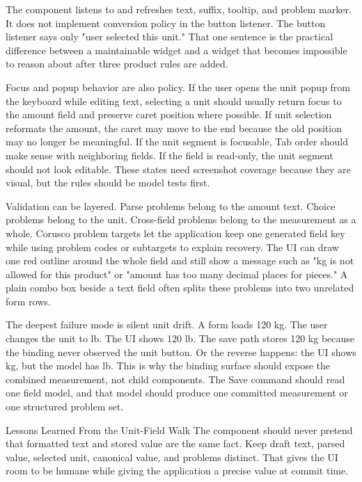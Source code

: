 The component listens to  and refreshes text, suffix, tooltip, and problem
marker. It does not implement conversion policy in the button listener. The button
listener says only "user selected this unit." That one sentence is the practical
difference between a maintainable widget and a widget that becomes impossible to reason
about after three product rules are added.

Focus and popup behavior are also policy. If the user opens the unit popup from the
keyboard while editing text, selecting a unit should usually return focus to the amount
field and preserve caret position where possible. If unit selection reformats the
amount, the caret may move to the end because the old position may no longer be
meaningful. If the unit segment is focusable, Tab order should make sense with
neighboring fields. If the field is read-only, the unit segment should not look
editable. These states need screenshot coverage because they are visual, but the rules
should be model tests first.

Validation can be layered. Parse problems belong to the amount text. Choice problems
belong to the unit. Cross-field problems belong to the measurement as a whole. Corusco
problem targets let the application keep one generated field key while using problem
codes or subtargets to explain recovery. The UI can draw one red outline around the
whole field and still show a message such as "kg is not allowed for this product" or
"amount has too many decimal places for pieces." A plain combo box beside a text field
often splits these problems into two unrelated form rows.

The deepest failure mode is silent unit drift. A form loads 120 kg. The user changes the
unit to lb. The UI shows 120 lb. The save path stores 120 kg because the binding never
observed the unit button. Or the reverse happens: the UI shows kg, but the model has lb.
This is why the binding surface should expose the combined measurement, not child
components. The Save command should read one field model, and that model should produce
one committed measurement or one structured problem set.

\begin{principlebox}{Lessons Learned From the Unit-Field Walk}
The component should never pretend that formatted text and stored value are the
same fact. Keep draft text, parsed value, selected unit, canonical value, and
problems distinct. That gives the UI room to be humane while giving the
application a precise value at commit time.
\end{principlebox}

